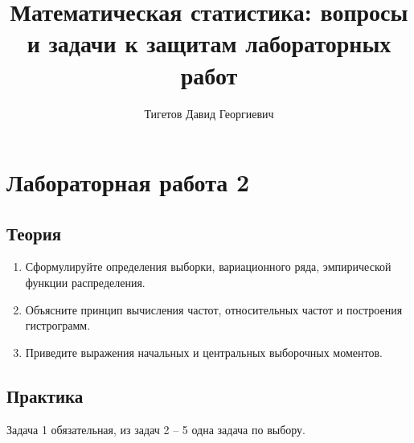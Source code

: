 \documentclass[a4paper,12pt]{article}
\begin{document}
\title{Математическая статистика: вопросы и задачи к защитам лабораторных работ}
\author{Тигетов Давид Георгиевич}
\maketitle

\section*{Лабораторная работа 2}

\subsection*{Теория}

\begin{enumerate}
      \item Сформулируйте определения выборки, вариационного ряда, эмпирической функции распределения.
      \item Объясните принцип вычисления частот, относительных частот и построения гистрограмм.
      \item Приведите выражения начальных и центральных выборочных моментов.
\end{enumerate}

\subsection*{Практика}

Задача 1 обязательная, из задач 2 -- 5 одна задача по выбору.
\end{document}
